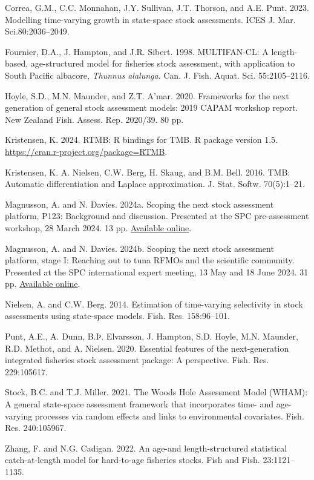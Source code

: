 \documentclass{SCreport}
\begin{document}
\begin{description}\setlength\itemsep{0ex}
  \item Correa, G.M., C.C. Monnahan, J.Y. Sullivan, J.T. Thorson, and A.E. Punt.
  2023. Modelling time-varying growth in state-space stock assessments. ICES J.
  Mar. Sci.80:2036--2049.
  \item Fournier, D.A., J. Hampton, and J.R. Sibert. 1998. MULTIFAN-CL: A
  length-based, age-structured model for fisheries stock assessment, with
  application to South Pacific albacore, \textit{Thunnus alalunga}. Can. J.
  Fish. Aquat. Sci. 55:2105--2116.
  \item Hoyle, S.D., M.N. Maunder, and Z.T. A'mar. 2020. Frameworks for the next
  generation of general stock assessment models: 2019 CAPAM workshop report. New
  Zealand Fish. Assess. Rep. 2020/39. 80 pp.
  \item Kristensen, K. 2024. RTMB: R bindings for TMB. R package version 1.5.\\
  \href{https://cran.r-project.org/package=RTMB}{https://cran.r-project.org/package=RTMB}.
  \item Kristensen, K. A. Nielsen, C.W. Berg, H. Skaug, and B.M. Bell. 2016.
  TMB: Automatic differentiation and Laplace approximation. J. Stat. Softw.
  70(5):1--21.
  \item Magnusson, A. and N. Davies. 2024a. Scoping the next stock assessment
  platform, P123: Background and discussion. Presented at the SPC pre-assessment
  workshop, 28 March 2024. 13 pp.
  \href{https://github.com/PacificCommunity/ofp-sam-transition-plan/blob/main/presentations/2024_03_28_paw_scoping/2024_03_28_paw_scoping.pdf}
  {Available online}.
  \item Magnusson, A. and N. Davies. 2024b. Scoping the next stock assessment
  platform, stage I: Reaching out to tuna RFMOs and the scientific community.
  Presented at the SPC international expert meeting, 13 May and 18 June 2024. 31
  pp.
  \href{https://github.com/PacificCommunity/ofp-sam-transition-plan/blob/main/presentations/2024_05_13_experts_scoping/2024_05_13_experts_scoping.pdf}
  {Available online}.
  \item Nielsen, A. and C.W. Berg. 2014. Estimation of time-varying selectivity
  in stock assessments using state-space models. Fish. Res. 158:96--101.
  \item Punt, A.E., A. Dunn, B.Þ. Elvarsson, J. Hampton, S.D. Hoyle, M.N.
  Maunder, R.D. Methot, and A. Nielsen. 2020. Essential features of the
  next-generation integrated fisheries stock assessment package: A perspective.
  Fish. Res. 229:105617.
  \item Stock, B.C. and T.J. Miller. 2021. The Woods Hole Assessment Model
  (WHAM): A general state-space assessment framework that incorporates time- and
  age-varying processes via random effects and links to environmental
  covariates. Fish. Res. 240:105967.
  \item Zhang, F. and N.G. Cadigan. 2022. An age-and length-structured
  statistical catch-at-length model for hard-to-age fisheries stocks. Fish and
  Fish. 23:1121--1135.
\end{description}
\end{document}
